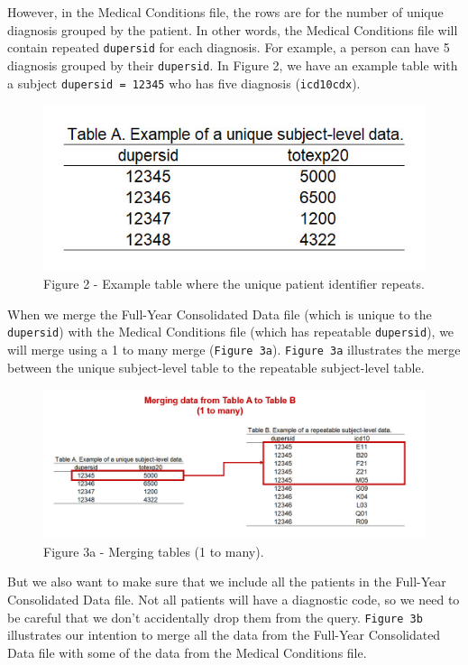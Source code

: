 \documentclass[
]{book}
\theoremstyle{definition}
\theoremstyle{definition}
\theoremstyle{definition}
\theoremstyle{definition}
\theoremstyle{remark}
\begin{document}
However, in the Medical Conditions file, the rows are for the number of unique diagnosis grouped by the patient. In other words, the Medical Conditions file will contain repeated \texttt{dupersid} for each diagnosis. For example, a person can have 5 diagnosis grouped by their \texttt{dupersid}. In Figure 2, we have an example table with a subject \texttt{dupersid\ =\ 12345} who has five diagnosis (\texttt{icd10cdx}).

\begin{figure}
\includegraphics[width=1\linewidth]{Figure 2_1} \caption{Figure 2 - Example table where the unique patient identifier repeats.}\label{fig:unnamed-chunk-10}
\end{figure}

When we merge the Full-Year Consolidated Data file (which is unique to the \texttt{dupersid}) with the Medical Conditions file (which has repeatable \texttt{dupersid}), we will merge using a 1 to many merge (\texttt{Figure\ 3a}). \texttt{Figure\ 3a} illustrates the merge between the unique subject-level table to the repeatable subject-level table.

\begin{figure}
\includegraphics[width=1\linewidth]{Figure 2_3a} \caption{Figure 3a - Merging tables (1 to many).}\label{fig:unnamed-chunk-11}
\end{figure}

But we also want to make sure that we include all the patients in the Full-Year Consolidated Data file. Not all patients will have a diagnostic code, so we need to be careful that we don't accidentally drop them from the query. \texttt{Figure\ 3b} illustrates our intention to merge all the data from the Full-Year Consolidated Data file with some of the data from the Medical Conditions file.
\end{document}
